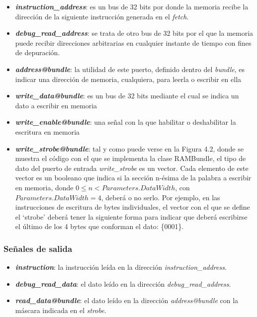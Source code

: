 \begin{itemize}
  \item \textbf{\textit{instruction\_address}}: es un bus de 32 bits por donde la memoria recibe la dirección de la siguiente instrucción generada en el \textit{fetch}.
  \vspace{-0.2cm}
  \item \textbf{\textit{debug\_read\_address}}: se trata de otro bus de 32 bits por el que la memoria puede recibir direcciones arbitrarias en cualquier instante de tiempo con fines de depuración.
  \vspace{-0.2cm}
  \item \textbf{\textit{address@bundle}}: la utilidad de este puerto, definido dentro del \textit{bundle}, es indicar una dirección de memoria, cualquiera, para leerla o escribir en ella
  \vspace{-0.2cm}
  \item \textbf{\textit{write\_data@bundle}}: es un bus de 32 bits mediante el cual se indica un dato a escribir en memoria
  \vspace{-0.2cm}
  \item \textbf{\textit{write\_enable@bundle}}: una señal con la que habilitar o deshabilitar la escritura en memoria
  \vspace{-0.2cm}
  \item \textbf{\textit{write\_strobe@bundle}}: tal y como puede verse en la Figura 4.2, donde se muestra el código con el que se implementa la clase RAMBundle, el tipo de dato del puerto de entrada \textit{write\_strobe} es un vector. Cada elemento de este vector es un booleano que indica si la sección n-ésima de la palabra a escribir en memoria, donde $0 \le n < Parameters.DataWidth$, con $Parameters.DataWidth = 4$, deberá o no serlo. Por ejemplo, en las instrucciones de escritura de bytes individuales, el vector con el que se define el `strobe' deberá tener la siguiente forma para indicar que deberá escribirse el último de los 4 bytes que conforman el dato: \{0001\}.
\end{itemize}

\subsubsection{Señales de salida}
\begin{itemize}
  \item \textbf{\textit{instruction}}: la instrucción leída en la dirección \textit{instruction\_address}.
  \vspace{-0.2cm}
  \item \textbf{\textit{debug\_read\_data}}: el dato leído en la dirección \textit{debug\_read\_address}.
  \vspace{-0.2cm}
  \item \textbf{\textit{read\_data@bundle}}: el dato leído en la dirección \textit{address@bundle} con la máscara indicada en el \textit{strobe}.
\end{itemize}

